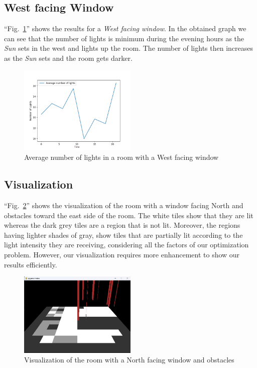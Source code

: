 \documentclass[conference]{IEEEtran}
\begin{document}
\subsection{West facing Window}
``Fig.~\ref{n_hourly_obsless_w}'' shows the results for a \textit{West facing
    window}. In the obtained graph we can see that the number of lights is
minimum during the evening hours as the \textit{Sun} sets in the west and lights
up the room. The number of lights then increases as the \textit{Sun} sets and
the room gets darker.
\begin{figure}[htbp]
    \centerline{\includegraphics[width=0.5\textwidth]{n_hourly_obsless_w2.png}}
    \caption{Average number of lights in a room with a West facing window}
    \label{n_hourly_obsless_w}
\end{figure}

\subsection{Visualization}
``Fig.~\ref{visualization}'' shows the visualization of the room with a window facing North and obstacles toward the east side of the room. The white tiles show that they are lit whereas the dark grey tiles are a region that is not lit. Moreover, the regions having lighter shades of gray, show tiles that are partially lit according to the light intensity they are receiving, considering all the factors of our optimization problem. However, our visualization requires more enhancement to show our results efficiently.
\begin{figure}[htbp]
    \centerline{\includegraphics[width=0.5\textwidth]{pygame.png}}
    \caption{Visualization of the room with a North facing window and obstacles}
    \label{visualization}
\end{figure}
\end{document}
